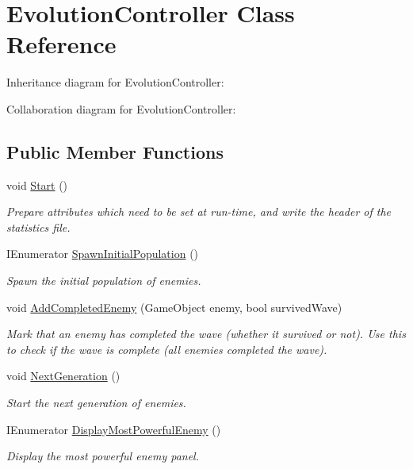 \hypertarget{class_evolution_controller}{}\section{Evolution\+Controller Class Reference}
\label{class_evolution_controller}


Inheritance diagram for Evolution\+Controller\+:


Collaboration diagram for Evolution\+Controller\+:
\subsection*{Public Member Functions}
\begin{DoxyCompactItemize}
\item 
void \mbox{\hyperlink{class_evolution_controller_a1f5c6f777133971fb18af4e032c20ab1}{Start}} ()
\begin{DoxyCompactList}\small\item\em Prepare attributes which need to be set at run-\/time, and write the header of the statistics file. \end{DoxyCompactList}\item 
I\+Enumerator \mbox{\hyperlink{class_evolution_controller_a7882ed1ac17cf9cb79a8559c3fa47676}{Spawn\+Initial\+Population}} ()
\begin{DoxyCompactList}\small\item\em Spawn the initial population of enemies. \end{DoxyCompactList}\item 
void \mbox{\hyperlink{class_evolution_controller_a07a968a7b94e9afd6fa0dd6755b6d07c}{Add\+Completed\+Enemy}} (Game\+Object enemy, bool survived\+Wave)
\begin{DoxyCompactList}\small\item\em Mark that an enemy has completed the wave (whether it survived or not). Use this to check if the wave is complete (all enemies completed the wave). \end{DoxyCompactList}\item 
void \mbox{\hyperlink{class_evolution_controller_ac65df1af1e9cdf179606f205e8f046f0}{Next\+Generation}} ()
\begin{DoxyCompactList}\small\item\em Start the next generation of enemies. \end{DoxyCompactList}\item 
I\+Enumerator \mbox{\hyperlink{class_evolution_controller_a56b57730a8b4707ffe1c8b8053871a84}{Display\+Most\+Powerful\+Enemy}} ()
\begin{DoxyCompactList}\small\item\em Display the most powerful enemy panel. \end{DoxyCompactList}\end{DoxyCompactItemize}
